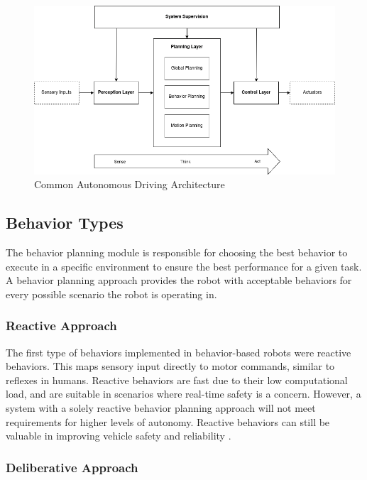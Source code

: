 \documentclass[letterpaper, 10pt, conference]{ieeeconf}
\begin{document}
\begin{figure}[ht]
	\centering
	\includegraphics[width=0.9\linewidth]{Figures/autonomous_driving_architecture.png}
	\caption{Common Autonomous Driving Architecture \cite{brooks1986,velasco2020}}
	\label{fig:autonomous_driving_architecture}
\end{figure}

\subsection{Behavior Types}

The behavior planning module is responsible for choosing the best behavior to execute in a specific environment to ensure the best performance for a given task. A behavior planning approach provides the robot with acceptable behaviors for every possible scenario the robot is operating in.

\subsubsection{Reactive Approach}

The first type of behaviors implemented in behavior-based robots were reactive behaviors. This maps sensory input directly to motor commands, similar to reflexes in humans. Reactive behaviors are fast due to their low computational load, and are suitable in scenarios where real-time safety is a concern. However, a system with a solely reactive behavior planning approach will not meet requirements for higher levels of autonomy. Reactive behaviors can still be valuable in improving vehicle safety and reliability \cite{desilva2008}.

\subsubsection{Deliberative Approach}
\end{document}
